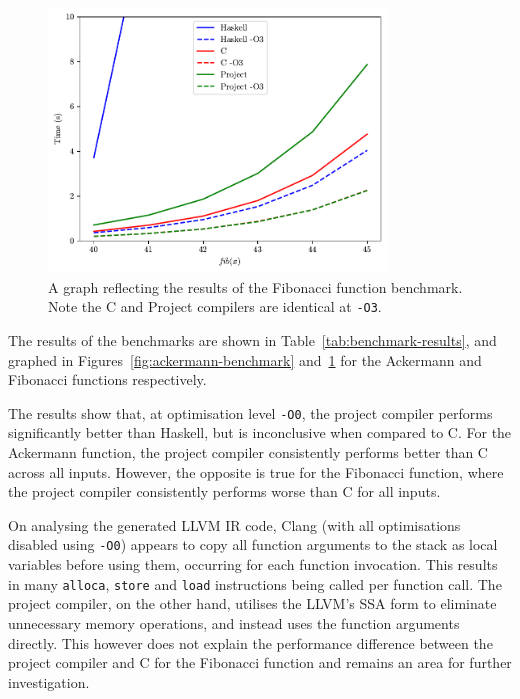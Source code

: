\begin{figure}
    \centering
    \includegraphics[width=0.8\textwidth]{Graphics/fibonacci-benchmark.pdf}
    \caption{A graph reflecting the results of the Fibonacci function benchmark. Note the C and
    Project compilers are identical at \texttt{-O3}.}
    \label{fig:fibonacci-benchmark}
\end{figure}

The results of the benchmarks are shown in Table~\ref{tab:benchmark-results}, and graphed in
Figures~\ref{fig:ackermann-benchmark} and~\ref{fig:fibonacci-benchmark} for the Ackermann and
Fibonacci functions respectively.

The results show that, at optimisation level \texttt{-O0}, the project compiler performs
significantly better than Haskell, but is inconclusive when compared to C. For the Ackermann
function, the project compiler consistently performs better than C across all inputs. However, the
opposite is true for the Fibonacci function, where the project compiler consistently performs worse
than C for all inputs.

On analysing the generated LLVM IR code, Clang (with all optimisations disabled using \texttt{-O0})
appears to copy all function arguments to the stack as local variables before using them, occurring
for each function invocation. This results in many \texttt{alloca}, \texttt{store} and \texttt{load}
instructions being called per function call. The project compiler, on the other hand, utilises the
LLVM's SSA form to eliminate unnecessary memory operations, and instead uses the function arguments
directly. This however does not explain the performance difference between the project compiler and
C for the Fibonacci function and remains an area for further investigation.

